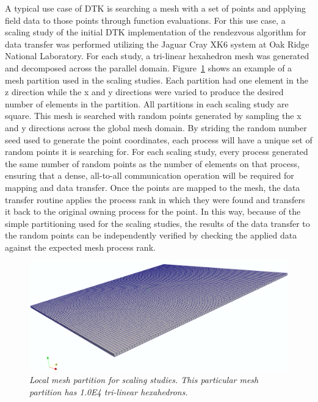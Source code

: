 \documentclass{mc2013}
\begin{document}
\label{subsec:cht}

\label{subsec:cfd_neutronics}

\label{sec:scaling_study}

A typical use case of DTK is searching a mesh with a set of points and
applying field data to those points through function evaluations. For
this use case, a scaling study of the initial DTK implementation of
the rendezvous algorithm for data transfer was performed utilizing the
Jaguar Cray XK6 system at Oak Ridge National Laboratory. For each
study, a tri-linear hexahedron mesh was generated and decomposed
across the parallel domain. Figure~\ref{fig:mesh_partition} shows an
example of a mesh partition used in the scaling studies. Each
partition had one element in the z direction while the x and y
directions were varied to produce the desired number of elements in
the partition. All partitions in each scaling study are square. This
mesh is searched with random points generated by sampling the x and y
directions across the global mesh domain.  By striding the random
number seed used to generate the point coordinates, each process will
have a unique set of random points it is searching for. For each
scaling study, every process generated the same number of random
points as the number of elements on that process, ensuring that a
dense, all-to-all communication operation will be required for mapping
and data transfer. Once the points are mapped to the mesh, the data
transfer routine applies the process rank in which they were found and
transfers it back to the original owning process for the point. In
this way, because of the simple partitioning used for the scaling
studies, the results of the data transfer to the random points can be
independently verified by checking the applied data against the
expected mesh process rank.

\begin{figure}[htpb!]
  \centering \includegraphics[width=4.5in]{mesh.png}
  \caption{\sl Local mesh partition for scaling studies. This
    particular mesh partition has 1.0E4 tri-linear hexahedrons.}
  \label{fig:mesh_partition}
\end{figure}
\end{document}
